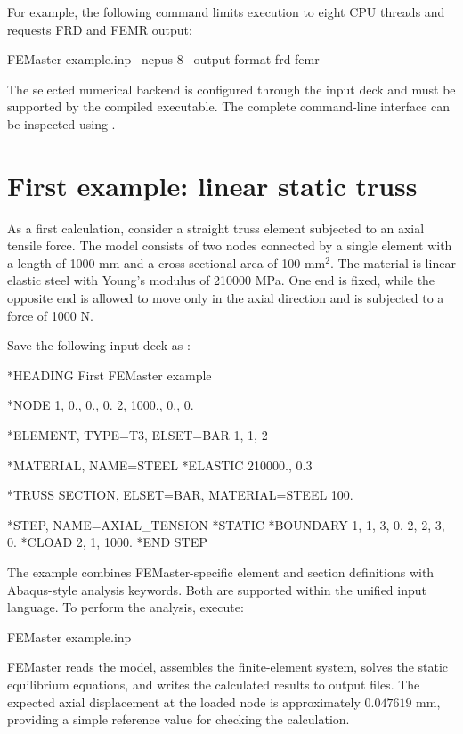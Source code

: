 For example, the following command limits execution to eight CPU
threads and requests FRD and FEMR output:

\begin{shellcmd}
FEMaster example.inp --ncpus 8 --output-format frd femr
\end{shellcmd}

The selected numerical backend is configured through the input
deck and must be supported by the compiled executable. The
complete command-line interface can be inspected using
.


\section{First example: linear static truss}
\label{sec:first-example}

As a first calculation, consider a straight truss element subjected
to an axial tensile force. The model consists of two nodes connected
by a single element with a length of 1000 mm and a cross-sectional
area of 100 mm\(^2\). The material is linear elastic steel with
Young's modulus of 210000 MPa. One end is fixed, while the opposite
end is allowed to move only in the axial direction and is subjected
to a force of 1000 N.

Save the following input deck as :

\begin{syntax}
*HEADING
First FEMaster example

*NODE
1, 0., 0., 0.
2, 1000., 0., 0.

*ELEMENT, TYPE=T3, ELSET=BAR
1, 1, 2

*MATERIAL, NAME=STEEL
*ELASTIC
210000., 0.3

*TRUSS SECTION, ELSET=BAR, MATERIAL=STEEL
100.

*STEP, NAME=AXIAL_TENSION
*STATIC
*BOUNDARY
1, 1, 3, 0.
2, 2, 3, 0.
*CLOAD
2, 1, 1000.
*END STEP
\end{syntax}

The example combines FEMaster-specific element and section
definitions with Abaqus-style analysis keywords. Both are
supported within the unified input language. To perform the
analysis, execute:

\begin{shellcmd}
FEMaster example.inp
\end{shellcmd}

FEMaster reads the model, assembles the finite-element system,
solves the static equilibrium equations, and writes the calculated
results to output files. The expected axial displacement at the
loaded node is approximately \(0.047619\) mm, providing a simple
reference value for checking the calculation.


